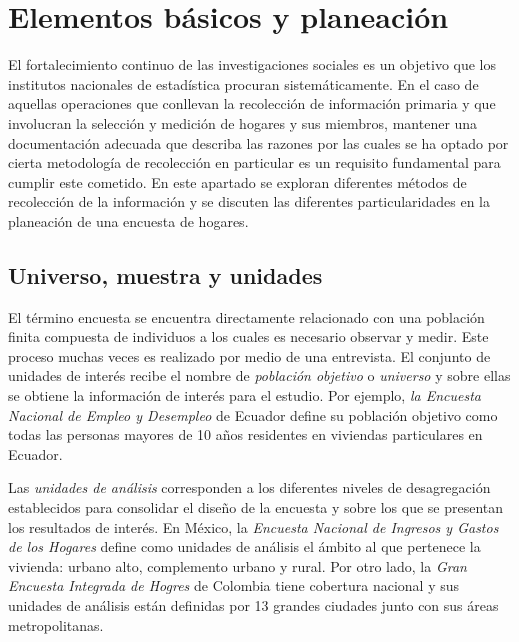 \documentclass[
  12pt,
  spanish,
]{book}
\begin{document}
\hypertarget{elementos-buxe1sicos-y-planeaciuxf3n}{%
\chapter{Elementos básicos y planeación}\label{elementos-buxe1sicos-y-planeaciuxf3n}}

El fortalecimiento continuo de las investigaciones sociales es un objetivo que los institutos nacionales de estadística procuran sistemáticamente. En el caso de aquellas operaciones que conllevan la recolección de información primaria y que involucran la selección y medición de hogares y sus miembros, mantener una documentación adecuada que describa las razones por las cuales se ha optado por cierta metodología de recolección en particular es un requisito fundamental para cumplir este cometido. En este apartado se exploran diferentes métodos de recolección de la información y se discuten las diferentes particularidades en la planeación de una encuesta de hogares.

\hypertarget{universo-muestra-y-unidades}{%
\section{Universo, muestra y unidades}\label{universo-muestra-y-unidades}}

El término encuesta se encuentra directamente relacionado con una población finita compuesta de individuos a los cuales es necesario observar y medir. Este proceso muchas veces es realizado por medio de una entrevista. El conjunto de unidades de interés recibe el nombre de \emph{población objetivo} o \emph{universo} y sobre ellas se obtiene la información de interés para el estudio. Por ejemplo, \emph{la Encuesta Nacional de Empleo y Desempleo} de Ecuador define su población objetivo como todas las personas mayores de 10 años residentes en viviendas particulares en Ecuador.

Las \emph{unidades de análisis} corresponden a los diferentes niveles de desagregación establecidos para consolidar el diseño de la encuesta y sobre los que se presentan los resultados de interés. En México, la \emph{Encuesta Nacional de Ingresos y Gastos de los Hogares} define como unidades de análisis el ámbito al que pertenece la vivienda: urbano alto, complemento urbano y rural. Por otro lado, la \emph{Gran Encuesta Integrada de Hogres} de Colombia tiene cobertura nacional y sus unidades de análisis están definidas por 13 grandes ciudades junto con sus áreas metropolitanas.
\end{document}
